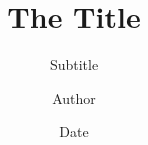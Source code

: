 \title{The Title}
\subtitle{Subtitle}
\author{Author}
\date{Date}

\begin{frame}
    \titlepage
\end{frame}

%